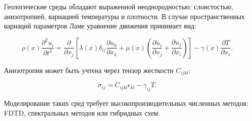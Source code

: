 Геологические среды обладают выраженной неоднородностью: слоистостью, анизотропией, вариацией температуры и плотности. В случае пространственных вариаций параметров Ламе уравнение движения  принимает вид:

\begin{equation}
\rho(x) \frac{\partial^2 u_i}{\partial t^2} =
\frac{\partial}{\partial x_j}
\left[
\lambda(x) \delta_{ij} \frac{\partial u_k}{\partial x_k}
+ \mu(x) \left(
\frac{\partial u_i}{\partial x_j} + \frac{\partial u_j}{\partial x_i}
\right)
\right]
- \gamma(x) \frac{\partial T}{\partial x_i}.
\end{equation}

Анизотропия может быть учтена через тензор жесткости $C_{ijkl}$:

\begin{equation}
\sigma_{ij} = C_{ijkl} \epsilon_{kl} - \gamma_{ij} T.
\end{equation}

Моделирование таких сред требует высокопроизводительных численных методов: FDTD, спектральных методов или гибридных схем.
